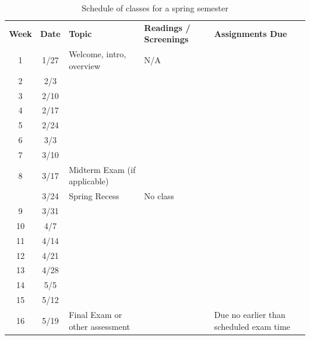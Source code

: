 \documentclass[12pt]{article} %
\begin{document}
\begin{center}
\begin{table}[h]
  \caption{Schedule of classes for a spring semester}
  \centering
  \begin{tabularx}{\linewidth}{c c >{\hsize}L >{\hsize}L >{\hsize}L}
  \textbf{Week} & \textbf{Date} & \textbf{Topic} & \textbf{Readings / Screenings} & \textbf{Assignments Due} \\
  1  & 1/27 & Welcome, intro, overview & N/A & \\
  2  & 2/3  &  &  & \\
  3  & 2/10 &  &  & \\
  4  & 2/17 &  &  & \\
  5  & 2/24 &  &  & \\
  6  & 3/3  &  &  & \\
  7  & 3/10 &  &  & \\
  8  & 3/17 & Midterm Exam (if applicable) & ~ & ~ \\
     & 3/24 & Spring Recess & No class & \\
  9  & 3/31 &  &  & \\
  10 & 4/7  &  &  & \\
  11 & 4/14 &  &  & \\
  12 & 4/21 &  &  & \\
  13 & 4/28 &  &  & \\
  14 & 5/5  &  &  & \\
  15 & 5/12 &  &  & \\
  16 & 5/19 & Final Exam or other assessment &  & Due no earlier than scheduled exam time \\
  \end{tabularx}
  \label{tab:schedule_of_classes}
\end{table}
\end{center}
\end{document}
